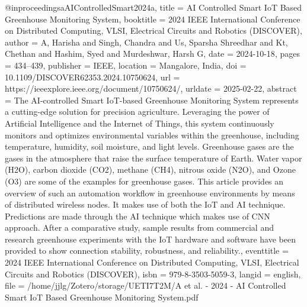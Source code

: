 @inproceedings{aAIControlledSmart2024a,
  title = {{{AI Controlled Smart IoT Based Greenhouse Monitoring System}}},
  booktitle = {2024 {{IEEE International Conference}} on {{Distributed Computing}}, {{VLSI}}, {{Electrical Circuits}} and {{Robotics}} ({{DISCOVER}})},
  author = {A, Harisha and Singh, Chandra and Us, Sparsha Shreedhar and Kt, Chethan and Hashim, Syed and Murdeshwar, Harsh G},
  date = {2024-10-18},
  pages = {434--439},
  publisher = {IEEE},
  location = {Mangalore, India},
  doi = {10.1109/DISCOVER62353.2024.10750624},
  url = {https://ieeexplore.ieee.org/document/10750624/},
  urldate = {2025-02-22},
  abstract = {The AI-controlled Smart IoT-based Greenhouse Monitoring System represents a cutting-edge solution for precision agriculture. Leveraging the power of Artificial Intelligence and the Internet of Things, this system continuously monitors and optimizes environmental variables within the greenhouse, including temperature, humidity, soil moisture, and light levels. Greenhouse gases are the gases in the atmosphere that raise the surface temperature of Earth. Water vapor (H2O), carbon dioxide (CO2), methane (CH4), nitrous oxide (N2O), and Ozone (O3) are some of the examples for greenhouse gases. This article provides an overview of such an automation workflow in greenhouse environments by means of distributed wireless nodes. It makes use of both the IoT and AI technique. Predictions are made through the AI technique which makes use of CNN approach. After a comparative study, sample results from commercial and research greenhouse experiments with the IoT hardware and software have been provided to show connection stability, robustness, and reliability.},
  eventtitle = {2024 {{IEEE International Conference}} on {{Distributed Computing}}, {{VLSI}}, {{Electrical Circuits}} and {{Robotics}} ({{DISCOVER}})},
  isbn = {979-8-3503-5059-3},
  langid = {english},
  file = {/home/jjlg/Zotero/storage/UETI7T2M/A et al. - 2024 - AI Controlled Smart IoT Based Greenhouse Monitoring System.pdf}
}

